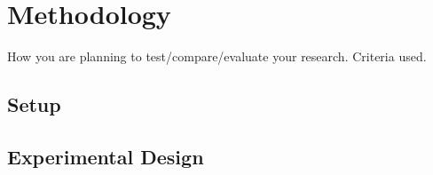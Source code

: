 \documentclass[../thesis.tex]{subfiles}
\begin{document}
    \chapter{Methodology}

    How you are planning to test/compare/evaluate your research.
    Criteria used.

    \section{Setup}

    \section{Experimental Design}
\end{document}
